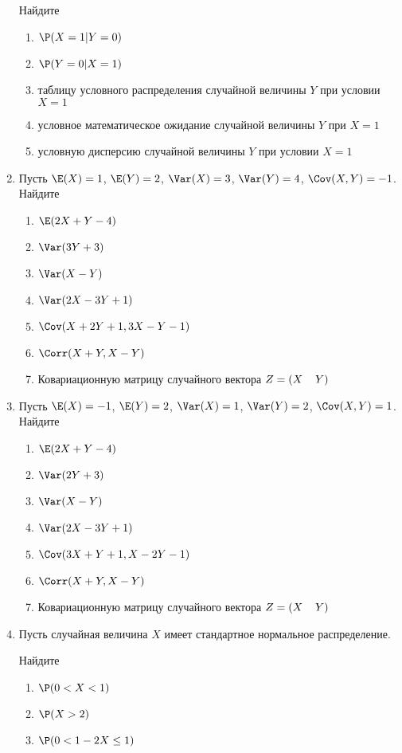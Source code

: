 \begin{enumerate}
Найдите
\begin{enumerate}
\item $\P(X = 1 | Y = 0)$
\item $\P(Y = 0 | X = 1)$
\item таблицу условного распределения случайной величины $Y$ при условии $X = 1$
\item условное математическое ожидание случайной величины $Y$ при $X = 1$
\item условную дисперсию случайной величины $Y$
при условии $X = 1$
\end{enumerate}

\item Пусть $\E(X)=1$, $\E(Y)=2$, $\Var(X) = 3$, $\Var(Y) = 4$, $\Cov(X,Y) = -1$. Найдите
\begin{enumerate}
\item $\E(2X + Y - 4)$
\item $\Var(3Y + 3)$
\item $\Var(X - Y)$
\item $\Var(2X - 3Y +1)$
\item $\Cov(X+ 2Y + 1,3X - Y -1)$
\item $\Corr(X + Y, X - Y)$
\item Ковариационную матрицу случайного вектора $Z = (X\hspace*{0.4cm} Y)$ \end{enumerate}


\item Пусть $\E(X)=-1$, $\E(Y)=2$, $\Var(X) = 1$, $\Var(Y) = 2$, $\Cov(X,Y) = 1$. Найдите
\begin{enumerate}
\item $\E(2X + Y - 4)$
\item $\Var(2Y + 3)$
\item $\Var(X - Y)$
\item $\Var(2X - 3Y +1)$
\item $\Cov(3X+ Y + 1,X - 2Y -1)$
\item $\Corr(X + Y, X - Y)$
\item Ковариационную матрицу случайного вектора $Z = (X\hspace*{0.4cm}Y)$
\end{enumerate}

\item Пусть случайная величина $X$ имеет стандартное нормальное распределение.

Найдите
\begin{enumerate}
\item $\P(0 < X < 1)$
\item $\P(X > 2)$
\item $\P(0 < 1 - 2X \leq 1)$
\end{enumerate}


\end{enumerate}
